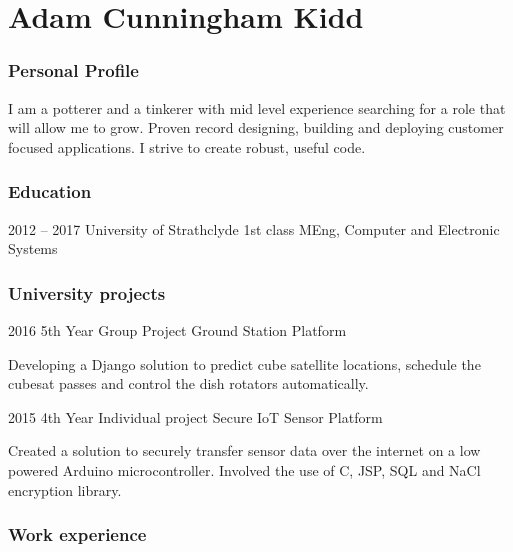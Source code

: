\documentclass{tccv}
\begin{document}
\part{Adam Cunningham Kidd }

\section{Personal Profile}
I am a potterer and a tinkerer with mid level experience searching for a role that will allow me to grow. Proven record designing, building and deploying customer focused applications. I strive to create robust, useful code.

\section{Education}


\begin{nuni}

\item{2012 -- 2017}
     {University of Strathclyde}
     {1st class MEng, Computer and Electronic Systems}
\end{nuni}

\section{University projects}

\begin{yearlist}

\item{2016}
     {5th Year Group Project}
     {Ground Station Platform}
\end{yearlist}

Developing a Django solution to predict cube satellite locations, schedule the cubesat passes and control the dish rotators automatically. 
\\ 

\begin{yearlist}
\item{2015}
     {4th Year Individual project}
     {Secure IoT Sensor Platform}
\end{yearlist}

Created a solution to securely transfer sensor data over the internet on a low powered Arduino microcontroller. Involved the use of C, JSP, SQL and NaCl encryption library.

\section{Work experience}
\end{document}
